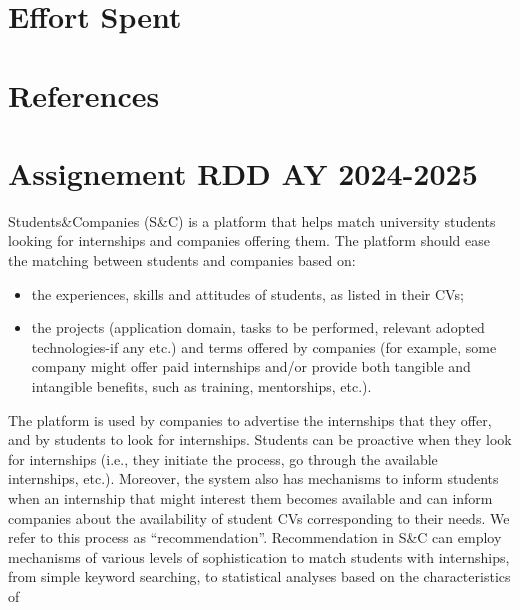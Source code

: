 \documentclass [11pt,twoside]{article}
\begin{document}
    \section{Effort Spent}
    \label{sect:effort}
    
    \clearpage
    \section{References}
    \label{sect:references}
    
    \clearpage
    \appendix
    \section{Assignement RDD AY 2024-2025}
    \label{appendix:assignement}
    Students\&Companies (S\&C) is a platform that helps match university students looking for internships
    and companies offering them. The platform should ease the matching between students and
    companies based on:
    \begin{itemize}
        \item the experiences, skills and attitudes of students, as listed in their CVs;
        \item the projects (application domain, tasks to be performed, relevant adopted technologies-if any etc.) and terms offered by companies (for example, some company might offer paid internships and/or provide both tangible and intangible benefits, such as training, mentorships, etc.).
    \end{itemize}
The platform is used by companies to advertise the internships that they offer, and by students to look
for internships. Students can be proactive when they look for internships (i.e., they initiate the process,
go through the available internships, etc.). Moreover, the system also has mechanisms to inform
students when an internship that might interest them becomes available and can inform companies
about the availability of student CVs corresponding to their needs. We refer to this process as
“recommendation”.
Recommendation in S\&C can employ mechanisms of various levels of sophistication to match students
with internships, from simple keyword searching, to statistical analyses based on the characteristics of
\end{document}
